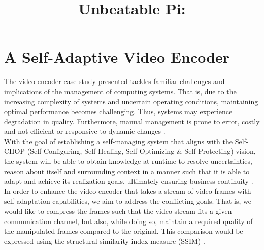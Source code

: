 \documentclass[conference]{IEEEtran}
\begin{document}
\title{Unbeatable Pi: \\
}

\author{
}

\maketitle



\section{\textbf{A Self-Adaptive Video Encoder}}\label{video_encoder_section}
The video encoder case study presented tackles familiar challenges and implications of the management of computing systems. That is, due to the increasing complexity of systems and uncertain operating conditions, maintaining optimal performance becomes challenging. Thus, systems may experience degradation in quality. Furthermore, manual management is prone to error, costly and not efficient or responsive to dynamic changes \cite{quiz_pdf}.\\

With the goal of establishing a self-managing system that aligns with the Self-CHOP (Self-Configuring, Self-Healing, Self-Optimizing \& Self-Protecting) vision, the system will be able to obtain knowledge at runtime to resolve uncertainties, reason about itself and surrounding context in a manner such that it is able to adapt and achieve its realization goals, ultimately ensuring business continuity \cite{quiz_pdf}.\\

In order to enhance the video encoder that takes a stream of video frames with self-adaptation capabilities, we aim to address the conflicting goals. That is, we would like to compress the frames such that the video stream fits a given communication channel, but also, while doing so,  maintain a required quality of the manipulated frames compared to the original. This comparison would be expressed using the structural similarity index measure (SSIM) \cite{quiz_pdf, DARTS_pdf}.\\
\end{document}

